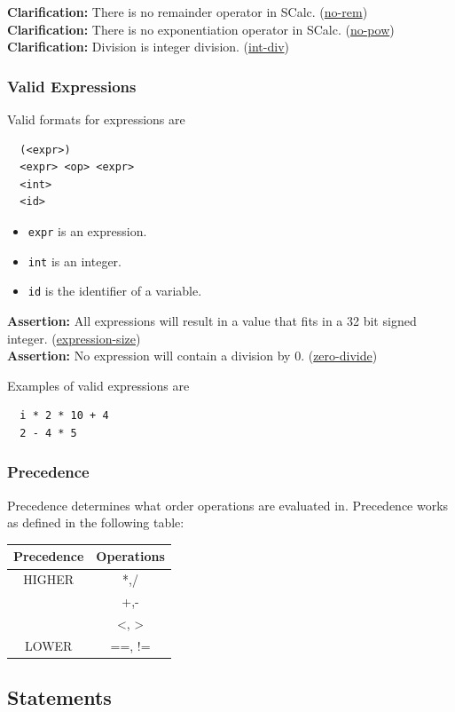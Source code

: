 \documentclass{article}
\newcommand{\code}[1]{\texttt{\textmd{#1}}}
\newcommand{\assertion}[2]{\textbf{Assertion: }#1 (\hyperlink{#2}{#2})}
\newcommand{\clarification}[2]{\textbf{Clarification: }#1 (\hyperlink{#2}{#2})}
\begin{document}
\clarification{There is no remainder operator in SCalc.}{no-rem}\\
\clarification{There is no exponentiation operator in SCalc.}{no-pow}\\
\clarification{Division is integer division.}{int-div}\\

\subsubsection{Valid Expressions}
Valid formats for expressions are
\begin{lstlisting}
  (<expr>)
  <expr> <op> <expr>
  <int>
  <id>
\end{lstlisting}

\begin{itemize}
  \item \code{expr} is an expression.
  \item \code{int} is an integer.
  \item \code{id} is the identifier of a variable.
\end{itemize}

\assertion{All expressions will result in a value that fits in a 32 bit signed integer.}
{expression-size}\\
\assertion{No expression will contain a division by 0.} {zero-divide}

Examples of valid expressions are
\begin{lstlisting}
  i * 2 * 10 + 4
  2 - 4 * 5
\end{lstlisting}

\subsubsection{Precedence}
Precedence determines what order operations are evaluated in. Precedence works as defined in the
following table:
\begin{center}
  \begin{tabular}{|c|c|}
  \hline
  \textbf{Precedence} & \textbf{Operations} \\
  \hline
  HIGHER
  & *,/ \\
  & +,- \\
  & <, > \\
  LOWER & ==, != \\
  \hline
  \end{tabular}
\end{center}

\subsection{Statements}
\end{document}
